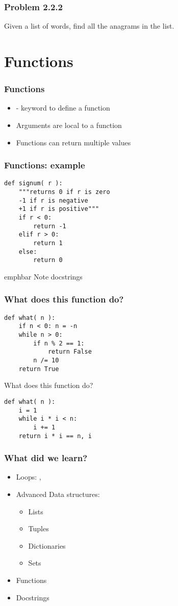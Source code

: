 \documentclass[14pt,compress]{beamer}
\newcommand{\emphbar}[1]
{\begin{beamercolorbox}[rounded=true]{emphbar} 
      {#1}
 \end{beamercolorbox}
}
\newcounter{time}
\newcommand{\inctime}[1]{\addtocounter{time}{#1}{\tiny \thetime\ m}}
\newcommand{\kwrd}[1]{ \texttt{\textbf{\color{blue}{#1}}}  }
\begin{document}
\begin{frame}
  \frametitle{Problem 2.2.2}
Given a list of words, find all the anagrams in the list.

\inctime{15}
\end{frame}

\section{Functions}
\begin{frame}[fragile]
  \frametitle{Functions}
  \begin{itemize}
    \item \kwrd{def} - keyword to define a function
    \item Arguments are local to a function
    \item Functions can return multiple values
  \end{itemize}
\end{frame}

\begin{frame}[fragile]
  \frametitle{Functions: example}
  \begin{lstlisting}
def signum( r ):
    """returns 0 if r is zero
    -1 if r is negative
    +1 if r is positive"""
    if r < 0:
        return -1
    elif r > 0:
        return 1
    else:
        return 0
  \end{lstlisting}
  \emphbar{Note docstrings}
\end{frame}

\begin{frame}[fragile]
  \frametitle {What does this function do?}
  \begin{lstlisting}
def what( n ):
    if n < 0: n = -n
    while n > 0:
        if n % 2 == 1:
            return False
        n /= 10
    return True
  \end{lstlisting}
\end{frame} 

\begin{frame}[fragile]
  {What does this function do?}
\begin{lstlisting}
def what( n ):
    i = 1
    while i * i < n:
        i += 1
    return i * i == n, i
  \end{lstlisting}
\end{frame}

\begin{frame}
  \frametitle{What did we learn?}
  \begin{itemize}
    \item Loops: \kwrd{while}, \kwrd{for}
    \item Advanced Data structures:
    \begin{itemize}
      \item Lists
      \item Tuples
      \item Dictionaries
      \item Sets
    \end{itemize}
    \item Functions
    \item Docstrings
  \end{itemize}
\end{frame}
\end{document}
